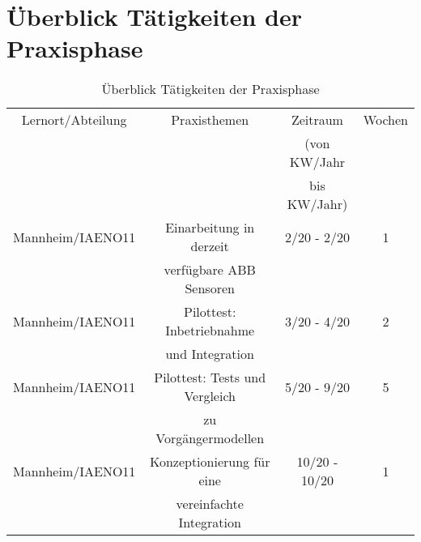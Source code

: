 \chapter*{Überblick Tätigkeiten der Praxisphase}

\renewcommand{\arraystretch}{1.5}
\begin{table}[h!]
  \centering
    \begin{tabular}{|c|c|c|c|}
    \hline
    Lernort/Abteilung & Praxisthemen                   & Zeitraum       & Wochen \\
    ~                 & ~                              & (von KW/Jahr   & ~      \\
    ~                 & ~                              & bis KW/Jahr)   & ~      \\ \hline
    Mannheim/IAENO11  & Einarbeitung in derzeit        & 2/20 - 2/20    & 1      \\
    ~                 & verfügbare ABB Sensoren        & ~              & ~      \\ \hline
    Mannheim/IAENO11  & Pilottest: Inbetriebnahme      & 3/20 - 4/20    & 2      \\
    ~                 & und Integration                & ~              & ~      \\ \hline
    Mannheim/IAENO11  & Pilottest: Tests und Vergleich & 5/20 - 9/20    & 5      \\
    ~                 & zu Vorgängermodellen           & ~              & ~      \\ \hline
    Mannheim/IAENO11  & Konzeptionierung für eine      & 10/20 - 10/20  & 1      \\
    ~                 & vereinfachte Integration       & ~              & ~      \\ \hline
    \end{tabular}
    \caption {Überblick Tätigkeiten der Praxisphase}
\end{table}
\renewcommand{\arraystretch}{1}
